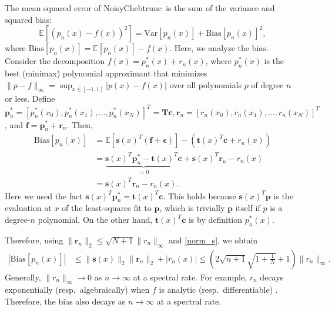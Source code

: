 \documentclass[final,onefignum,onetabnum]{siamart220329}
\def\mainalg{NoisyChebtrunc}
\newcommand{\vct}[1]{\bm{#1}}
\newcommand{\T}{\bm{T}}
\begin{document}
The mean squared error of \mainalg\ is the sum of the variance and squared bias:
\[
\mathbb{E}[(p_n(x)-f(x))^2] = \mbox{Var}[p_n(x)] + \mbox{Bias}[p_n(x)]^2,
\]
where $\mbox{Bias}[p_n(x)] =\mathbb{E}[p_n(x)]-f(x)$.
Here, we analyze the bias.
Consider the decomposition $f(x)=p^*_n(x)+r_n(x)$, where 
$p^*_{n}(x)$ is the best (minimax) polynomial approximant that minimizes $\|p-f\|_\infty = \sup_{x \in [-1,1]} |p(x)-f(x)|$ over all polynomials $p$ of degree $n$ or less. 
Define $\vct{p}^*_{n}=[p^*_n(x_0),p^*_n(x_1),\dots,p^*_n(x_N)]^T=\T \vct{c}, \vct{r}_n=[r_n(x_0),r_n(x_1),\dots,r_n(x_N)]^T$, and $\vct{f}=\vct{p}^*_{n}+\vct{r}_{n}$.
Then, \begin{align}
	\label{eq:bias}
	\mbox{Bias}[p_n(x)]&=\mathbb{E}[\vct{s}(x)^T (\vct{f}+\vct{\epsilon})]-(\vct{t}(x)^T \vct{c} + r_n(x)) \nonumber \\
	&=\underbrace{\vct{s}(x)^T \vct{p}_n^* - \vct{t}(x)^T \vct{c}}_{=0} + \vct{s}(x)^T \vct{r}_n-r_n(x) \nonumber \\
	&=\vct{s}(x)^T \vct{r}_n-r_n(x).
\end{align}
Here we used the fact 
$\vct{s}(x)^T \vct{p}_n^* = \vct{t}(x)^T \vct{c}$. This holds because $\vct{s}(x)^T \vct{p}$
is the evaluation at $x$ of the least-squares fit to $\vct{p}$, which is trivially $\vct{p}$ itself if $p$ is a degree-$n$ polynomial. On the other hand, $\vct{t}(x)^T \vct{c}$ is by definition $p_n^*(x)$. 

Therefore, using $\| \vct{r}_n \|_2 \leq \sqrt{N+1} \| r_n \|_{\infty}$ and \eqref{norm_s}, we obtain 
\begin{align*}
	| \mbox{Bias}[p_n(x)] | & \leq \| \vct{s}(x) \|_2 \| \vct{r}_n \|_2 + |r_n(x)| \leq \left( 2 \sqrt{n+1} \sqrt{1+\frac{1}{N}} + 1 \right) \| r_n \|_{\infty}.
\end{align*}
Generally, $\|r_n\|_\infty\rightarrow 0$ as $n\rightarrow\infty$ at a spectral rate.
For example, $r_n$ decays exponentially (resp.~algebraically) when $f$ is analytic (resp.~differentiable) \cite[Ch.~7,8]{trefethenatap}.
Therefore, the bias also decays as $n\rightarrow\infty$ at a spectral rate.
\end{document}
